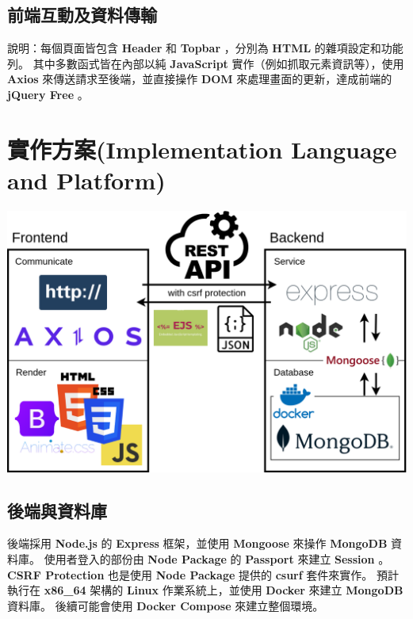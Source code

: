 \documentclass{article}
\begin{document}
\pagebreak

\subsection{前端互動及資料傳輸}



說明：每個頁面皆包含 \textbf{Header} 和 \textbf{Topbar} ，分別為 \textbf{HTML} 的雜項設定和功能列。
其中多數函式皆在內部以純 \textbf{JavaScript} 實作（例如抓取元素資訊等），使用 \textbf{Axios} 來傳送請求至後端，並直接操作 \textbf{DOM} 來處理畫面的更新，達成前端的 \textbf{jQuery Free} 。

\newpage

\section[實作方案(IMPLEMENTATION LANGUAGE AND PLATFORM)]{實作方案(Implementation Language and Platform)}

\centerline{\includegraphics[width=\textwidth]{HighLevelArchitecture.png}}

\bigskip

\subsection{後端與資料庫}

後端採用 \textbf{Node.js} 的 \textbf{Express} 框架，並使用 \textbf{Mongoose} 來操作 \textbf{MongoDB} 資料庫。
使用者登入的部份由 \textbf{Node Package} 的 \textbf{Passport} 來建立 \textbf{Session} 。
\textbf{CSRF Protection} 也是使用 \textbf{Node Package} 提供的 \textbf{csurf} 套件來實作。
預計執行在 \textbf{x86\_64} 架構的 \textbf{Linux} 作業系統上，並使用 \textbf{Docker} 來建立 \textbf{MongoDB} 資料庫。
後續可能會使用 \textbf{Docker Compose} 來建立整個環境。
\end{document}
